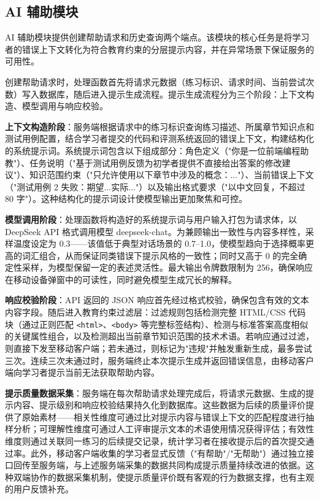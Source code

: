 \subsection{AI 辅助模块}

AI 辅助模块提供创建帮助请求和历史查询两个端点。该模块的核心任务是将学习者的错误上下文转化为符合教育约束的分层提示内容，并在异常场景下保证服务的可用性。

创建帮助请求时，处理函数首先将请求元数据（练习标识、请求时间、当前尝试次数）写入数据库，随后进入提示生成流程。提示生成流程分为三个阶段：上下文构造、模型调用与响应校验。

\textbf{上下文构造阶段}：服务端根据请求中的练习标识查询练习描述、所属章节知识点和测试用例配置，结合学习者提交的代码和评测系统返回的错误上下文，构建结构化的系统提示词。系统提示词包含以下组成部分：角色定义（"你是一位前端编程助教"）、任务说明（"基于测试用例反馈为初学者提供不直接给出答案的修改建议"）、知识范围约束（"只允许使用以下章节中涉及的概念：..."）、当前错误上下文（"测试用例 2 失败：期望...实际..."）以及输出格式要求（"以中文回复，不超过 80 字"）。这种结构化的提示词设计使模型输出更加聚焦和可控。

\textbf{模型调用阶段}：处理函数将构造好的系统提示词与用户输入打包为请求体，以 DeepSeek API 格式调用模型 deepseek-chat。为兼顾输出一致性与内容多样性，采样温度设定为 0.3——该值低于典型对话场景的 0.7--1.0，使模型趋向于选择概率更高的词汇组合，从而保证同类错误下提示风格的一致性；同时又高于 0 的完全确定性采样，为模型保留一定的表述灵活性。最大输出令牌数限制为 256，确保响应在移动设备弹窗中的可读性，同时避免模型生成冗长的解释。

\textbf{响应校验阶段}：API 返回的 JSON 响应首先经过格式校验，确保包含有效的文本内容字段。随后进入教育约束过滤层：过滤规则包括检测完整 HTML/CSS 代码块（通过正则匹配 \texttt{<html>}、\texttt{<body>} 等完整标签结构）、检测与标准答案高度相似的关键属性组合，以及检测超出当前章节知识范围的技术术语。若响应通过过滤，则直接下发至移动客户端；若未通过，则标记为"违规"并触发重新生成，最多尝试三次。连续三次未通过时，服务端终止本次提示生成并返回错误信息，由移动客户端向学习者提示当前无法获取帮助内容。

\textbf{提示质量数据采集}：服务端在每次帮助请求处理完成后，将请求元数据、生成的提示内容、提示级别和响应校验结果持久化到数据库。这些数据为后续的质量评价提供了原始素材——相关性维度可通过比对提示内容与错误上下文的匹配程度进行抽样分析；可理解性维度可通过人工评审提示文本的术语使用情况获得评估；有效性维度则通过关联同一练习的后续提交记录，统计学习者在接收提示后的首次提交通过率。此外，移动客户端收集的学习者显式反馈（"有帮助"/"无帮助"）通过独立接口回传至服务端，与上述服务端采集的数据共同构成提示质量持续改进的依据。这种双端协作的数据采集机制，使提示质量评价既有客观的行为数据支撑，也有主观的用户反馈补充。

